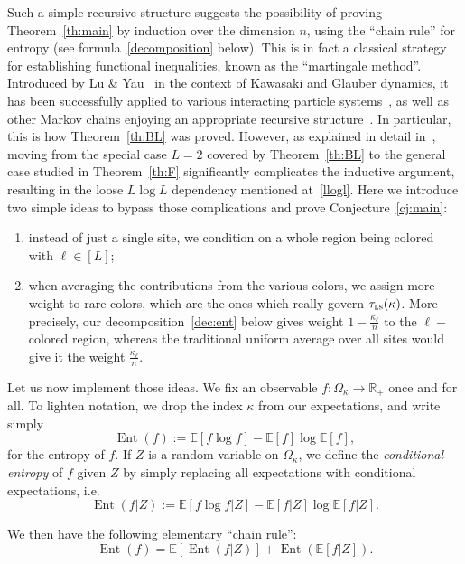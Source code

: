 \documentclass[AHL,Unicode,longabstracts,published]{cedram}
\newcommand{\R}{\mathbb{R}}
\newcommand{\EE}{\mathbb{E}}
\newcommand{\tls}{\tau_{\textsc{ls}}}
\DeclareMathOperator{\ent}{Ent}
\newcommand*{\romanenumi}{\renewcommand*{\theenumi}{\roman{enumi}}}
\begin{document}
Such a simple recursive structure suggests the possibility of proving Theorem~\ref{th:main} by induction over the dimension $n$, using the ``chain rule'' for entropy (see formula~\eqref{decomposition} below). This is in fact a classical strategy for establishing functional inequalities, known as the ``martingale method''. Introduced by Lu \& Yau~\cite{MR1233852} in the context of Kawasaki and Glauber dynamics, it has been successfully applied to various interacting particle systems~\cite{Cap,MR2094147,MR2023890,hermon2019entropy,MR1675008,MR1483598}, as well as other Markov chains enjoying an appropriate recursive structure~\cite{MR1944012,2018arXiv180903546F,2019arXiv190202775H,1181997,MR2099650}. In particular, this is how Theorem~\ref{th:BL} was proved. However, as explained in detail in~\cite{2018arXiv180903546F}, moving from the special case $L=2$ covered by Theorem~\ref{th:BL} to the general case studied in Theorem~\ref{th:F} significantly complicates the inductive argument, resulting in the loose $L\log L$ dependency mentioned at~\eqref{llogl}. Here we introduce two simple ideas to bypass those complications and prove Conjecture~\ref{cj:main}:
\begin{enumerate}\romanenumi
\item \label{3.1.i} instead of just a single site, we condition on a whole region being colored with $\ell\in[L]$;
\item \label{3.1.ii}when averaging the contributions from the various colors, we assign more weight to rare colors, which are the ones which really govern $\tls(\kappa)$. More precisely, our decomposition~\eqref{dec:ent} below gives weight $1-\frac{\kappa_\ell} n$ to the $\ell-$colored region, whereas the traditional uniform average over all sites would give it the weight $\frac{\kappa_\ell}{n}$.
\end{enumerate}
Let us now implement those ideas. We fix an observable $f\colon\Omega_\kappa\to\R_+$ once and for all. To lighten notation, we drop the index $\kappa$ from our expectations, and write simply
\[
\ent(f) := \EE\left[f\log f\right] -\EE[f]\log\EE[f],
\]
for the entropy of $f$. If $Z$ is a random variable on $\Omega_\kappa$, we define the \emph{conditional entropy} of $f$ given $Z$ by simply replacing all expectations with conditional expectations, i.e.
\[
\ent(f|Z) := \EE[f\log f|Z] -\EE[f|Z]\log\EE[f|Z].
\]

We then have the following elementary ``chain rule'':
\begin{equation}\label{decomposition}
\ent(f) = \EE\left[\ent(f|Z)\right]+\ent\left(\EE[f|Z]\right).
\end{equation}
\end{document}

